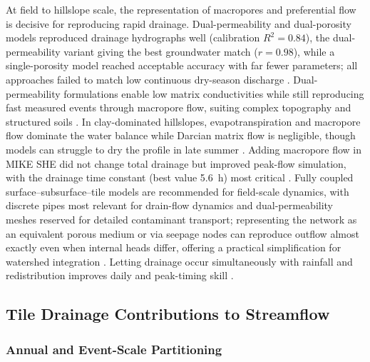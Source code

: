 \documentclass[11pt]{article}
\begin{document}
At field to hillslope scale, the representation of macropores and preferential flow is decisive for reproducing rapid drainage. Dual-permeability and dual-porosity models reproduced drainage hydrographs well (calibration $R^2=0.84$), the dual-permeability variant giving the best groundwater match ($r=0.98$), while a single-porosity model reached acceptable accuracy with far fewer parameters; all approaches failed to match low continuous dry-season discharge \parencite{Varvaris2018}. Dual-permeability formulations enable low matrix conductivities while still reproducing fast measured events through macropore flow, suiting complex topography and structured soils \parencite{Warsta2014,Salo2017}. In clay-dominated hillslopes, evapotranspiration and macropore flow dominate the water balance while Darcian matrix flow is negligible, though models can struggle to dry the profile in late summer \parencite{Koivusalo1999}. Adding macropore flow in MIKE SHE did not change total drainage but improved peak-flow simulation, with the drainage time constant (best value 5.6~h) most critical \parencite{Zhou2013}. Fully coupled surface--subsurface--tile models are recommended for field-scale dynamics, with discrete pipes most relevant for drain-flow dynamics and dual-permeability meshes reserved for detailed contaminant transport; representing the network as an equivalent porous medium or via seepage nodes can reproduce outflow almost exactly even when internal heads differ, offering a practical simplification for watershed integration \parencite{DeSchepper2015,Carlier2007,Boico2022}. Letting drainage occur simultaneously with rainfall and redistribution improves daily and peak-timing skill \parencite{Xian2017}.

\subsection{Tile Drainage Contributions to Streamflow}

\subsubsection{Annual and Event-Scale Partitioning}
\end{document}

